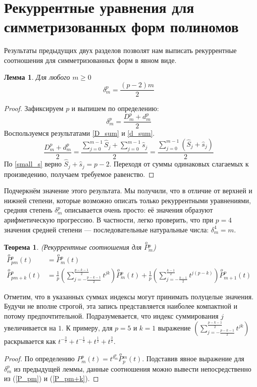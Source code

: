 \documentclass[14pt, a4paper, russian]{report}
\newtheorem{lemma}{\indent Лемма}
\newtheorem{theorem}{\indent Теорема}
\newcommand{\SymPol}[2]{\overset{o}{P}{}^{#1}_{#2}}
\begin{document}
\section{Рекуррентные уравнения для симметризованных форм полиномов}
Результаты предыдущих двух разделов позволят нам выписать рекуррентные соотношения для симметризованных форм в явном виде. 
\begin{lemma}
Для любого $m \ge 0$
$$ \delta_m^p = \frac{(p-2)m}{2}$$
\end{lemma}
\begin{proof}
Зафиксируем $p$ и выпишем по определению:
$$\delta_m^p = \frac{D_m^p + d_m^p}{2}$$
Воспользуемся результатами \cref{D_sum} и \cref{d_sum}.
$$ \frac{D_m^p + d_m^p}{2} =  \frac{\sum\limits_{j=0}^{m-1}\hat{S}_j + \sum\limits_{j=0}^{m-1}\hat{s}_j}{2} =  \frac{\sum\limits_{j=0}^{m-1}(\hat{S}_j + \hat{s}_j)}{2}$$
По \cref{small_s} верно $\hat{S}_j + \hat{s}_j = p-2$. Переходя от суммы одинаковых слагаемых к произведению, получаем требуемое равенство.
\end{proof}
Подчеркнём значение этого результата. Мы получили, что в отличие от верхней и нижней степени, которые возможно описать только рекуррентными уравнениями, средняя степень $\delta_m^p$ описывается очень просто: её значения образуют арифметическую прогрессию. В частности, легко проверить, что при $p=4$ значения средней степени --- последовательные натуральные числа: $\delta_m^4 = m$.
\begin{theorem}(Рекуррентные соотношения для  $\SymPol{p}{m}$)
\begin{align}
    \SymPol{p}{pm}(t)&=\SymPol{p}{m}(t)\\
    \SymPol{p}{pm+k}(t)&=\frac{1}{p}\left(\sum\limits_{j=-\frac{p-k-1}{2}}^{\frac{p-k-1}{2}} t^{jk}\right)\SymPol{p}{m}(t)+\frac{1}{p}\left(\sum\limits_{j=-\frac{k-1}{2}}^\frac{k-1}{2} t^{j(p-k)}\right)\SymPol{p}{m+1}(t)
\end{align}
\end{theorem}
Отметим, что в указанных суммах индексы могут принимать полуцелые значения. Будучи не вполне строгой, эта запись представляется наиболее компактной и потому предпочтительной. Подразумевается, что индекс суммирования $j$ увеличивается на $1$. К примеру, для $p=5$ и $k=1$ выражение $\left(\sum\limits_{j=-\frac{p-k-1}{2}}^{\frac{p-k-1}{2}} t^{jk}\right)$ раскрывается как $t^{-\frac{3}{2}} + t^{-\frac{1}{2}} + t^{\frac{1}{2}} +  t^{\frac{3}{2}}$.
\begin{proof} По определению $P_m^p(t) = t^{\delta_m^p}\SymPol{m}{p}(t)$. Подставив явное выражение для $\delta_m^p$ из предыдущей леммы, данные соотношения можно вывести непосредственно из (\ref{P_pm}) и (\ref{P_pm+k}).
\end{proof}
\end{document}
